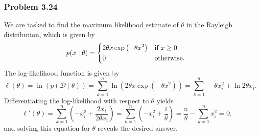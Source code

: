 \documentclass[12pt, a4paper]{article}
\newcommand{\D}{\mathcal{D}}
\begin{document}
\subsubsection*{Problem 3.24}
We are tasked to find the maximum likelihood estimate of $\theta$ in the Rayleigh distribution, which is given by
\begin{equation*}
	p (x  \mid  \theta) = 
	\begin{dcases*}
	2 \theta x \exp \left( -\theta x^2 \right) & if $x \geq 0$ \\
	0 & otherwise.
	\end{dcases*}
\end{equation*}
The log-likelihood function is given by
\begin{equation*}
	\ell(\theta)= \ln \left( p (\D  \mid  \theta) \right) 
	= 
	\sum_{k=1}^{n} \ln \left( 2 \theta x \exp \left( -\theta x^2 \right) \right)
	= 
	\sum_{k=1}^{n} - \theta x_i^2 + \ln 2 \theta x_i.
\end{equation*}
Differentiating the log-likelihood with respect to $\theta$ yields
\begin{equation*}
	\ell'(\theta) =
	\sum_{k=1}^{n} \left(-  x_i^2 + \frac{2 x_i}{2 \theta x_i}\right)
	=
	\sum_{k=1}^{n} \left(-  x_i^2 + \frac{1}{\theta}\right)
	=
	\frac{n}{\theta} - \sum_{k=1}^{n}  x_i^2 
	= 0,
\end{equation*}
and solving this equation for $\theta$ reveals the desired answer.
\end{document}
